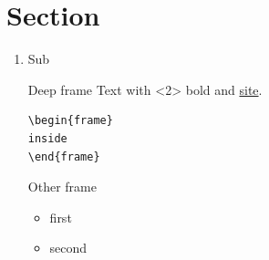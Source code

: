 \section{Section}
\label{sec:orgc72830f}
\begin{enumerate}
\item Sub
\label{sec:org755fd41}
\begin{orgframe}[label={sec:org9d95c0c},fragile]{Deep frame}
 Text with <2> \alert{bold} and \href{https://orgmode.org}{site}.

\begin{verbatim}
\begin{frame}
inside
\end{frame}
\end{verbatim}
\end{orgframe}
\begin{block}{Other frame}
\begin{itemize}
\item<1-> first
\item second
\end{itemize}

\setcounter{tocdepth}{1}
\tableofcontents[currentsection]
\end{block}
\end{enumerate}
